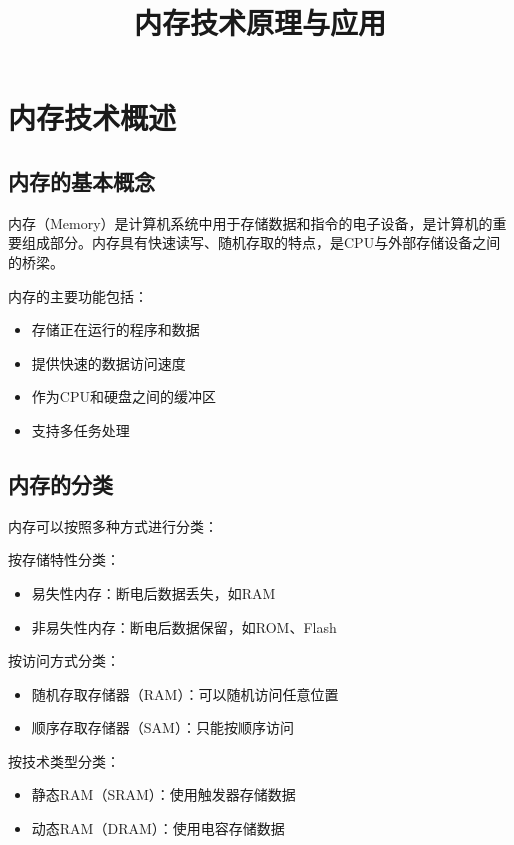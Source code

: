 \documentclass{article}
\title{内存技术原理与应用}
\author{}
\date{}
\begin{document}
\maketitle

\tableofcontents

\section{内存技术概述}

\subsection{内存的基本概念}

内存（Memory）是计算机系统中用于存储数据和指令的电子设备，是计算机的重要组成部分。内存具有快速读写、随机存取的特点，是CPU与外部存储设备之间的桥梁。

内存的主要功能包括：
\begin{itemize}
    \item 存储正在运行的程序和数据
    \item 提供快速的数据访问速度
    \item 作为CPU和硬盘之间的缓冲区
    \item 支持多任务处理
\end{itemize}

\subsection{内存的分类}

内存可以按照多种方式进行分类：

按存储特性分类：
\begin{itemize}
    \item 易失性内存：断电后数据丢失，如RAM
    \item 非易失性内存：断电后数据保留，如ROM、Flash
\end{itemize}

按访问方式分类：
\begin{itemize}
    \item 随机存取存储器（RAM）：可以随机访问任意位置
    \item 顺序存取存储器（SAM）：只能按顺序访问
\end{itemize}

按技术类型分类：
\begin{itemize}
    \item 静态RAM（SRAM）：使用触发器存储数据
    \item 动态RAM（DRAM）：使用电容存储数据
\end{itemize}
\end{document}
